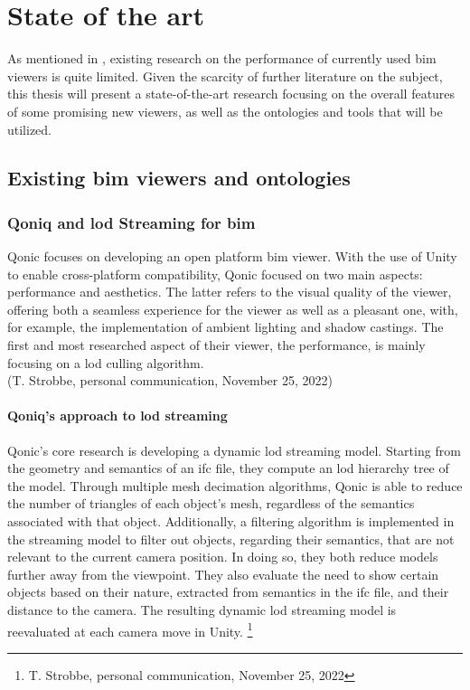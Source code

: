\chapter{State of the art} \label{ch:stateOfTheArt}
As mentioned in \cite{Johansson2015}, existing research on the performance of currently used \ac{bim} viewers is quite limited. Given the scarcity of further literature on the subject, this thesis will present a state-of-the-art research focusing on the overall features of some promising new viewers, as well as the ontologies and tools that will be utilized.

\section{Existing \acs{bim} viewers and ontologies}
\subsection{Qoniq and \acs{lod} Streaming for \acs{bim}}
Qonic focuses on developing an open platform \ac{bim} viewer. With the use of Unity to enable cross-platform compatibility, Qonic focused on two main aspects: performance and aesthetics. The latter refers to the visual quality of the viewer, offering both a seamless experience for the viewer as well as a pleasant one, with, for example, the implementation of ambient lighting and shadow castings. The first and most researched aspect of their viewer, the performance, is mainly focusing on a \ac{lod} culling algorithm.
\\(T. Strobbe, personal communication, November 25, 2022)

\subsubsection{Qoniq's approach to \acs{lod} streaming}
Qonic's core research is developing a dynamic \ac{lod} streaming model. Starting from the geometry and semantics of an \ac{ifc} file, they compute an \ac{lod} hierarchy tree of the model. Through multiple mesh decimation algorithms, Qonic is able to reduce the number of triangles of each object's mesh, regardless of the semantics associated with that object. Additionally, a filtering algorithm is implemented in the streaming model to filter out objects, regarding their semantics, that are not relevant to the current camera position. In doing so, they both reduce models further away from the viewpoint. They also evaluate the need to show certain objects based on their nature, extracted from semantics in the \ac{ifc} file, and their distance to the camera. The resulting dynamic \ac{lod} streaming model is reevaluated at each camera move in Unity.
\footnote{T. Strobbe, personal communication, November 25, 2022}

